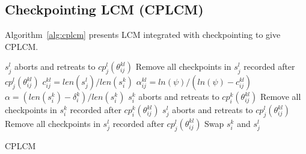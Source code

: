 \subsection{Checkpointing LCM (CPLCM)}\label{sec:cplcm}
%
Algorithm~\ref{alg:cplcm} presents LCM integrated with checkpointing to give CPLCM. 
%
\begin{algorithm}
\footnotesize{
\LinesNumbered
{}
{
	{$s_{j}^l$ aborts and retreats to $cp_j^l(\theta_{ij}^{kl})$\label{cp-step_sicommits}\;
	Remove all checkpoints in $s_j^l$ recorded after $cp_j^l(\theta_{ij}^{kl})$\label{cp_step_rem_cp_jl_1}}
	{$c_{ij}^{kl}=len(s_j^l)/len(s_i^k)$\label{cp-step_cijkl}\;
	$\alpha_{ij}^{kl}=ln(\psi)/(ln(\psi)-c_{ij}^{kl})$\label{cp-step_alphaijkl}\;
	$\alpha=\left(len(s_i^k)-\delta_i^k\right)/len(s_i^k)$\label{cp_step_alpha}\;
	{$s_{i}^k$ aborts and retreats to $cp_i^k(\theta_{ij}^{kl})$\label{cp-step_siaborts}\;
	Remove all checkpoints in $s_i^k$ recorded after $cp_i^k(\theta_{ij}^{kl})$\label{cp_step_rem_cp_ik}}
	{$s_{j}^l$ aborts and retreats to $cp_j^l(\theta_{ij}^{kl})$\label{cp-step_sjaborts}\;
	Remove all checkpoints in $s_j^l$ recorded after $cp_j^l(\theta_{ij}^{kl})$\label{cp_step_rem_cp_jl_2}}
	}
	}
	{
	Swap $s_i^k$ and $s_j^l$\label{cplcm:s_j_l start before s_i_k}\;
	}
	}
\caption{CPLCM}
\label{alg:cplcm}
\end{algorithm}
%
